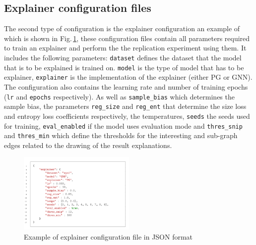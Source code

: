 \subsection{Explainer configuration files}
The second type of configuration is the explainer configuration an example of which is shown in Fig.\,\ref{fig:explainer-config-example}, these configuration files contain all parameters required to train an explainer and perform the the replication experiment using them. It includes the following parameters: \texttt{dataset} defines the dataset that the model that is to be explained is trained on. \texttt{model} is the type of model that has to be explainer, \texttt{explainer} is the implementation of the explainer (either PG or GNN). The configuration also contains the learning rate  and number of training epochs (\texttt{lr} and \texttt{epochs} respectively). As well as \texttt{sample\_bias} which determines the sample bias, the parameters \texttt{reg\_size} and \texttt{reg\_ent} that determine the size loss and entropy loss coefficients respectively, the temperatures, \texttt{seeds} the seeds used for training, \texttt{eval\_enabled} if the model uses evaluation mode and \texttt{thres\_snip} and \texttt{thres\_min} which define the thresholds for the interesting and sub-graph edges related to the drawing of the result explanations.  
\begin{figure}[h!]
    \centering
    \includegraphics[width=0.5\textwidth]{../openreview/imgs/config-examples/explainer-config-example.png}
    \caption{Example of explainer configuration file in JSON format} 
\label{fig:explainer-config-example}
\end{figure}